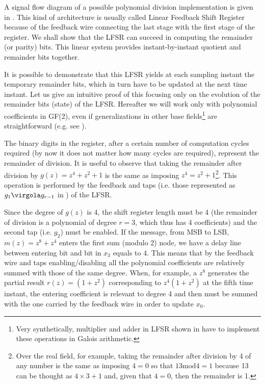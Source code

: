 A signal flow diagram of a possible polynomial division implementation is given in . This kind of architecture is usually called Linear Feedback Shift Register because of the feedback wire connecting the last stage with the first stage of the register. We shall show that the LFSR can succeed in computing the remainder (or parity) bits. This linear system provides instant-by-instant quotient and remainder bits together.

It is possible to demonstrate that this LFSR yields at each sampling instant the temporary remainder bits, which in turn have to be updated at the next time instant. Let us give an intuitive proof of this focusing only on the evolution of the remainder bits (state) of the LFSR. Hereafter we will work only with polynomial coefficients in GF(2), even if generalizations in other base fields\footnote{Very synthetically, multiplier and adder in LFSR shown in  have to implement these operations in Galois arithmetic.} are straightforward (e.g. see \cite{b:mcwilliams, b:wicker, b:moon, b:ProakisDG}).

The binary digits in the register, after a certain number of computation cycles required (by now it does not matter how many cycles are required), represent the remainder of division. It is useful to observe that taking the remainder after division by \(g(z)=z^4+z^2+1\) is the same as imposing \(z^4=z^2+1\)\footnote{Over the real field, for example, taking the remainder after division by 4 of any number is the same as imposing \(4=0\) so that \(13 \textrm{mod} 4 = 1\) because 13 can be thought as \(4\times3+1\) and, given that \(4=0\), then the remainder is 1.}.
This operation is performed by the feedback and taps (i.e. those represented as \(g_1\virgola g_{r-1}\) in ) of the LFSR.

Since the degree of \(g(z)\) is 4, the shift register length must be 4 (the remainder of division is a polynomial of degree \(r=3\), which thus has 4 coefficients) and the second tap (i.e. \(g_2\)) must be enabled. If the message, from MSB to LSB, \(m(z)=z^8+z^4\) enters the first sum (modulo 2) node, we have a delay line between entering bit and bit in \(x_3\) equals to 4. This means that by the feedback wire and taps enabling/disabling all the polynomial coefficients are relatively summed with those of the same degree. When, for example, a \(z^8\) generates the partial result \(r(z)=(1+z^2)\) corresponding to \(z^4(1+z^2)\) at the fifth time instant, the entering coefficient is relevant to degree 4 and then must be summed with the one carried by the feedback wire in order to update \(x_0\).

